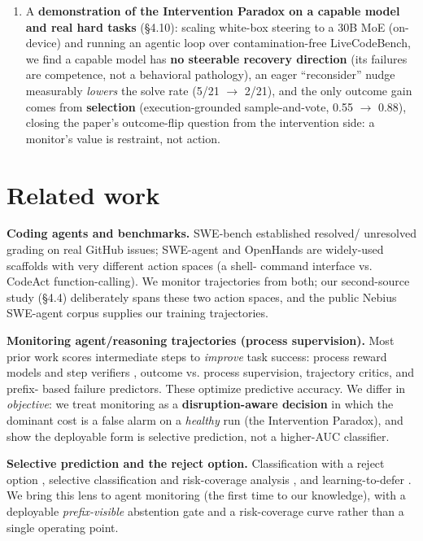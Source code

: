 \begin{enumerate}
\item A \textbf{demonstration of the Intervention Paradox on a capable model and real hard tasks} (\S4.10): scaling white-box steering to a 30B MoE (on-device) and running an agentic loop over contamination-free LiveCodeBench, we find a capable model has \textbf{no steerable recovery direction} (its failures are competence, not a behavioral pathology), an eager ``reconsider'' nudge measurably \emph{lowers} the solve rate (5/21 $\to$ 2/21), and the only outcome gain comes from \textbf{selection} (execution-grounded sample-and-vote, 0.55 $\to$ 0.88), closing the paper's outcome-flip question from the intervention side: a monitor's value is restraint, not action.
\end{enumerate}
\section*{Related work}
\textbf{Coding agents and benchmarks.} SWE-bench \citep{jimenez2024swebench} established resolved/ unresolved grading on real GitHub issues; SWE-agent \citep{yang2024sweagent} and OpenHands \citep{wang2024openhands} are widely-used scaffolds with very different action spaces (a shell- command interface vs. CodeAct function-calling). We monitor trajectories from both; our second-source study (\S4.4) deliberately spans these two action spaces, and the public Nebius SWE-agent corpus supplies our training trajectories.

\textbf{Monitoring agent/reasoning trajectories (process supervision).} Most prior work scores intermediate steps to \emph{improve} task success: process reward models and step verifiers \citep{lightman2023verify}, outcome vs. process supervision, trajectory critics, and prefix- based failure predictors. These optimize predictive accuracy. We differ in \emph{objective}: we treat monitoring as a \textbf{disruption-aware decision} in which the dominant cost is a false alarm on a \emph{healthy} run (the Intervention Paradox), and show the deployable form is selective prediction, not a higher-AUC classifier.

\textbf{Selective prediction and the reject option.} Classification with a reject option \citep{chow1970reject}, selective classification and risk-coverage analysis \citep{elyaniv2010foundations,geifman2017selectivenet}, and learning-to-defer \citep{madras2018predict,mozannar2020consistent}. We bring this lens to agent monitoring (the first time to our knowledge), with a deployable \emph{prefix-visible} abstention gate and a risk-coverage curve rather than a single operating point.


